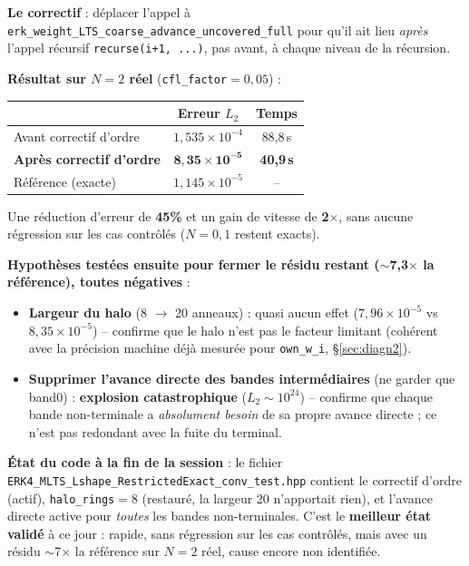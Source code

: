 \documentclass[11pt]{article}
\begin{document}
\textbf{Le correctif} : déplacer l'appel à
\texttt{erk\_weight\_LTS\_coarse\_advance\_uncovered\_full} pour qu'il
ait lieu \emph{après} l'appel récursif \texttt{recurse(i+1, ...)}, pas
avant, à chaque niveau de la récursion.

\textbf{Résultat sur $N=2$ réel} (\texttt{cfl\_factor}$=0{,}05$) :
\begin{center}
\begin{tabular}{@{}lcc@{}}
\toprule
& Erreur $L_2$ & Temps \\
\midrule
Avant correctif d'ordre & $1{,}535\times10^{-4}$ & 88,8\,s \\
\textbf{Après correctif d'ordre} & $\mathbf{8{,}35\times10^{-5}}$ & \textbf{40,9\,s} \\
Référence (exacte) & $1{,}145\times10^{-5}$ & -- \\
\bottomrule
\end{tabular}
\end{center}
Une réduction d'erreur de \textbf{45\%} et un gain de vitesse de
\textbf{2$\times$}, sans aucune régression sur les cas contrôlés
($N=0,1$ restent exacts).

\textbf{Hypothèses testées ensuite pour fermer le résidu restant
($\sim$7,3$\times$ la référence), toutes négatives} :
\begin{itemize}
  \item \textbf{Largeur du halo} (8 $\to$ 20 anneaux) : quasi aucun effet
  ($7{,}96\times10^{-5}$ vs $8{,}35\times10^{-5}$) -- confirme que le
  halo n'est pas le facteur limitant (cohérent avec la précision machine
  déjà mesurée pour \texttt{own\_w\_i}, \S\ref{sec:diagn2}).
  \item \textbf{Supprimer l'avance directe des bandes intermédiaires}
  (ne garder que band0) : \textbf{explosion catastrophique}
  ($L_2\sim10^{24}$) -- confirme que chaque bande non-terminale a
  \emph{absolument besoin} de sa propre avance directe ; ce n'est pas
  redondant avec la fuite du terminal.
\end{itemize}

\textbf{État du code à la fin de la session} : le fichier
\texttt{ERK4\_MLTS\_Lshape\_RestrictedExact\_conv\_test.hpp} contient le
correctif d'ordre (actif), \texttt{halo\_rings}$=8$ (restauré, la
largeur 20 n'apportait rien), et l'avance directe active pour
\emph{toutes} les bandes non-terminales. C'est le \textbf{meilleur état
validé} à ce jour : rapide, sans régression sur les cas contrôlés, mais
avec un résidu $\sim$7$\times$ la référence sur $N=2$ réel, cause
encore non identifiée.
\end{document}
